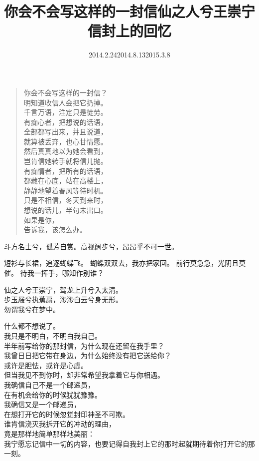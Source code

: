 \documentclass{article}
\begin{document}
\title{你会不会写这样的一封信}
\begin{verse}
你会不会写这样的一封信？\\
明知道收信人会把它扔掉。\\
千言万语，注定只是徒劳。\\
有痴心者，把想说的话语，\\
全部都写出来，并且说道，\\
就算被丢弃，也心甘情愿。\\
然后真真地以为她会看到，\\
岂肯信她转手就将信儿抛。\\
有痴情者，把所有的话语，\\
都藏在心底，站在高楼上，\\
静静地望着春风等待时机。\\
只是不相信，冬天到来时，\\
想说的话儿，半句未出口。\\
如果是你，\\
告诉我，该怎么办。\\
\end{verse}\date{2014.2.24}


斗方名士兮，孤芳自赏。高视阔步兮，昂昂乎不可一世。

短衫与长裙，追逐蝴蝶飞。
蝴蝶双双去，我亦把家回。
前行莫急急，光阴且莫催。
待我一挥手，哪知作别谁？

\title{仙之人兮王崇宁}
仙之人兮王崇宁，驾龙上升兮入太清。\\
步玉屐兮执蕉扇，渺渺白云兮身无形。\\
勿谓我兮在梦中。
\date{2014.8.13}

\title{信封上的回忆}
什么都不想说了。\\
我只是不明白，不明白我自己。\\
半年前写给你的那封信，为什么现在还留在我手里？\\
我曾日日把它带在身边，为什么始终没有把它送给你？\\
或许是胆怯，或许是心虚。\\
但当我见不到你时，却非常希望我拿着它与你相遇。\\
我确信自己不是一个邮递员，\\
 在有机会给你的时候犹犹豫豫。\\
我确信又是一个邮递员，\\
 在想打开它的时候忽觉封印神圣不可欺。\\
谁肯信浇灭我拆开它的冲动的理由，\\
 竟是那样地简单那样地美丽：\\
我宁愿忘记信中一切的内容，也要记得自我封上它的那时起就期待着你打开它的那一刻。
\date{2015.3.8}
\end{document}
